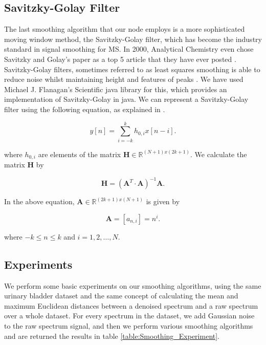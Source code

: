 \documentclass[11pt,openany]{book}
\begin{document}
\subsection{Savitzky-Golay Filter}
The last smoothing algorithm that our node employs is a more sophisticated moving window method, the Savitzky-Golay filter, which has become the industry standard in signal smoothing for MS. In 2000, Analytical Chemistry even chose Savitzky and Golay's paper as a top 5 article that they have ever posted \cite{sav_golay_top10}. Savitzky-Golay filters, sometimes referred to as least squares smoothing is able to reduce noise whilst maintaining height and features of peaks \cite{savitzky-golay-lecture-notes}. We have used Michael J. Flanagan's Scientific java library \cite{flanagan_jar_savitzky_golay} for this, which provides an implementation of Savitzky-Golay in java. We can represent a Savitzky-Golay filter using the following equation, as explained in \cite{alan_race_phd_thesis}.

\begin{equation}
    y[n] = \sum_{i = -k}^k h_{0,i} x[n-i].
\end{equation}

where $h_{0,i}$ are elements of the matrix $\mathbf{H} \in \mathbb{R}^{(N+1) x (2k+1)}$. We calculate the matrix $\mathbf{H}$ by

\begin{equation}
    \mathbf{H} = (\mathbf{A}^T \cdot \mathbf{A}) ^{-1} \mathbf{A}.
\end{equation}

In the above equation, $\mathbf{A} \in \mathbb{R}^{(2k+1)x(N+1)}$ is given by

\begin{equation}
    \mathbf{A} = [a_{n,i}] = n^i. 
\end{equation}

where $-k \leq n \leq k$ and $i = 1, 2, \dots , N$.

\subsection{Experiments}
We perform some basic experiments on our smoothing algorithms, using the same urinary bladder dataset and the same concept of calculating the mean and maximum Euclidean distances between a denoised spectrum and a raw spectrum over a whole dataset. For every spectrum in the dataset, we add Gaussian noise to the raw spectrum signal, and then we perform various smoothing algorithms and are returned the results in table \ref{table:Smoothing_Experiment}.
\end{document}
